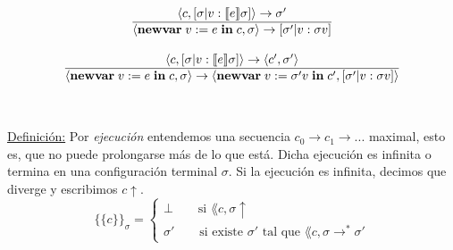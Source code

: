 \begin{multicols}{2}
\[\begin{array}{cll}
        \lang{c, [\sigma | v : \semsAGU{e}]} \rightarrow \sigma' \\
        \overline{\lang{\newvar{v := e}{c}, \sigma} \rightarrow [\sigma' | v : \sigma v]} \\ \\
        \lang{c, [\sigma | v : \semsAGU{e}]} \rightarrow \lang{c', \sigma'} \\
        \overline{\lang{\newvar{v := e}{c}, \sigma} \rightarrow \lang{\newvar{v := \sigma' v}{c'}, [\sigma' | v : \sigma v]}} \\ \\ \\
      \end{array}\]
    \end{multicols}

    \PN \underline{Definición:} Por \textit{ejecución} entendemos una secuencia $c_0 \rightarrow c_1 \rightarrow ...$ maximal, esto es, que no puede prolongarse más de lo que está. Dicha ejecución es infinita o termina en una configuración terminal $\sigma$. Si la ejecución es infinita, decimos que diverge y escribimos $c \uparrow$.
    \[
    \{\!\!\{c\}\!\!\}_{\sigma} = \begin{cases}
      \bot \qquad \text{si } \lang{c, \sigma} \uparrow \\
      \sigma' \qquad \text{si existe } \sigma' \text{ tal que } \lang{c, \sigma} \rightarrow^{\ast} \sigma'
    \end{cases}
    \]

